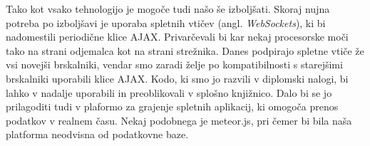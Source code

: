 \documentclass[a4paper, 12pt, twoside]{book}
\begin{document}
Tako kot vsako tehnologijo je mogoče tudi našo še izboljšati. Skoraj nujna potreba po izboljšavi je uporaba spletnih vtičev (angl. \textit{WebSockets}), ki bi nadomestili periodične klice AJAX. Privarčevali bi kar nekaj procesorske moči tako na strani odjemalca kot na strani strežnika. Danes podpirajo spletne vtiče že vsi novejši brskalniki, vendar smo zaradi želje po kompatibilnosti s starejšimi brskalniki uporabili klice AJAX. Kodo, ki smo jo razvili v diplomski nalogi, bi lahko v nadalje uporabili in preoblikovali v splošno knjižnico. Dalo bi se jo prilagoditi tudi v plaformo za grajenje spletnih aplikacij, ki omogoča prenos podatkov v realnem času. Nekaj podobnega je meteor.js, pri čemer bi bila naša platforma neodvisna od podatkovne baze.

\end{document}
